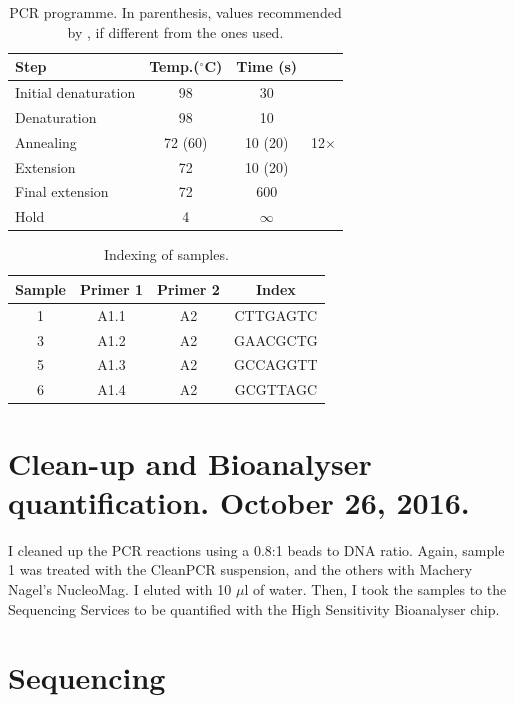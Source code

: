 \documentclass[a4paper,12pt]{article}
\begin{document}
\begin{table}
 \begin{center}
  \caption{PCR programme. In parenthesis, values recommended by \citet{Meyer2010}, if different from the ones used.}\label{tau:pcrprogramme}
  \vspace*{0.3cm}
  \begin{tabular}{lccl}
   \toprule
Step&Temp.($^\circ$C)&Time (s)&\\
   \midrule
Initial denaturation&98&30&\\
Denaturation&98&\multicolumn{1}{c|}{10}&\\
Annealing&72 (60)&\multicolumn{1}{c|}{10 (20)}&12$\times$\\
Extension&72&\multicolumn{1}{c|}{10 (20)}&\\
Final extension&72&600&\\
Hold&4&$\infty$&\\
   \bottomrule
  \end{tabular}
 \end{center}
\end{table}

\begin{table}
 \begin{center}
  \caption{Indexing of samples.}\label{tau:index}
  \begin{tabular}{cccc}
   \toprule
Sample&Primer 1&Primer 2&Index\\
   \midrule
1&A1.1&A2&CTTGAGTC\\
3&A1.2&A2&GAACGCTG\\
5&A1.3&A2&GCCAGGTT\\
6&A1.4&A2&GCGTTAGC\\
   \bottomrule
  \end{tabular}
 \end{center}
\end{table}

\section{Clean-up and Bioanalyser quantification. October 26, 2016.}
I cleaned up the PCR reactions using a 0.8:1 beads to DNA ratio. Again, sample 1 was treated with the CleanPCR suspension, and the others with Machery Nagel's NucleoMag. I eluted with 10 $\mu$l of water. Then, I took the samples to the Sequencing Services to be quantified with the High Sensitivity Bioanalyser chip.

\section{Sequencing}



\end{document}
